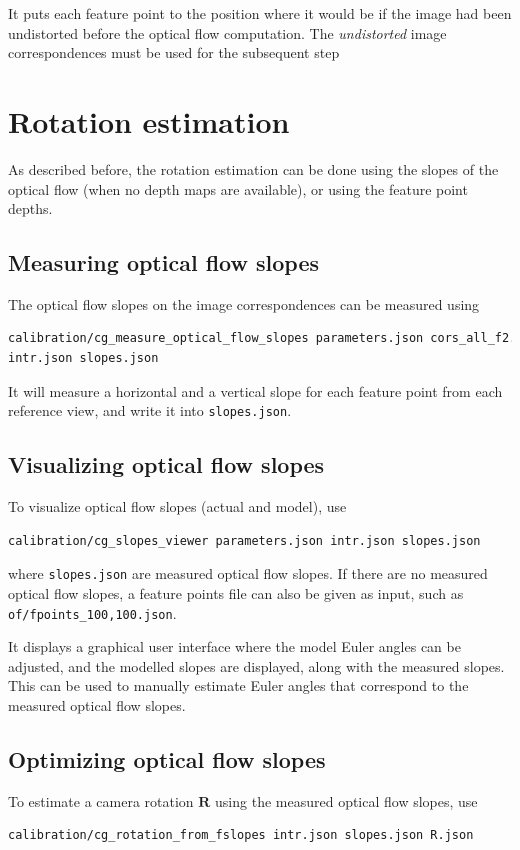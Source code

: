 \documentclass{scrreprt}
\newcommand{\matr}[1]{\mathbf{#1}}
\begin{document}
\noindent It puts each feature point to the position where it would be if the image had been undistorted before the optical flow computation. The \emph{undistorted} image correspondences must be used for the subsequent step




\section{Rotation estimation}
As described before, the rotation estimation can be done using the slopes of the optical flow (when no depth maps are available), or using the feature point depths.


\subsection{Measuring optical flow slopes}
The optical flow slopes on the image correspondences can be measured using
\begin{lstlisting}[language=bash]
calibration/cg_measure_optical_flow_slopes parameters.json cors_all_f2.bin
intr.json slopes.json
\end{lstlisting}

\noindent It will measure a horizontal and a vertical slope for each feature point from each reference view, and write it into \texttt{slopes.json}.


\subsection{Visualizing optical flow slopes}
To visualize optical flow slopes (actual and model), use
\begin{lstlisting}[language=bash]
calibration/cg_slopes_viewer parameters.json intr.json slopes.json
\end{lstlisting}
where \texttt{slopes.json} are measured optical flow slopes. If there are no measured optical flow slopes, a feature points file can also be given as input, such as \texttt{of/fpoints\_100,100.json}.

It displays a graphical user interface where the model Euler angles can be adjusted, and the modelled slopes are displayed, along with the measured slopes. This can be used to manually estimate Euler angles that correspond to the measured optical flow slopes.


\subsection{Optimizing optical flow slopes}
To estimate a camera rotation $\matr{R}$ using the measured optical flow slopes, use
\begin{lstlisting}[language=bash]
calibration/cg_rotation_from_fslopes intr.json slopes.json R.json
\end{lstlisting}
\end{document}
